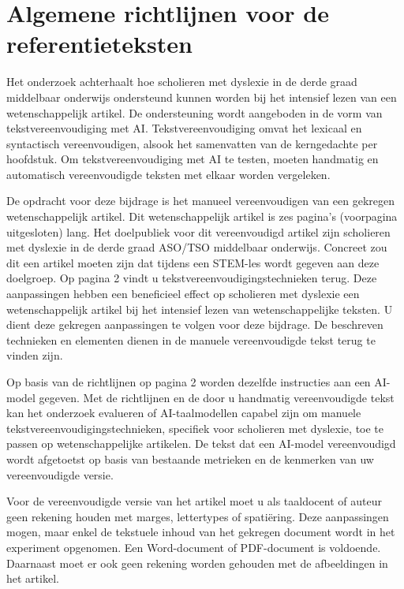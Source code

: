 \chapter{Algemene richtlijnen voor de referentieteksten}
\label{ch:referentietekst}
	
Het onderzoek achterhaalt hoe scholieren met dyslexie in de derde graad middelbaar onderwijs ondersteund kunnen worden bij het intensief lezen van een wetenschappelijk artikel. De ondersteuning wordt aangeboden in de vorm van tekstvereenvoudiging met AI. Tekstvereenvoudiging omvat het lexicaal en syntactisch vereenvoudigen, alsook het samenvatten van de kerngedachte per hoofdstuk. Om tekstvereenvoudiging met AI te testen, moeten handmatig en automatisch vereenvoudigde teksten met elkaar worden vergeleken. 
	
	\medspace
	
De opdracht voor deze bijdrage is het manueel vereenvoudigen van een gekregen wetenschappelijk artikel. Dit wetenschappelijk artikel is zes pagina's (voorpagina uitgesloten) lang. Het doelpubliek voor dit vereenvoudigd artikel zijn scholieren met dyslexie in de derde graad ASO/TSO middelbaar onderwijs. Concreet zou dit een artikel moeten zijn dat tijdens een STEM-les wordt gegeven aan deze doelgroep. Op pagina 2 vindt u tekstvereenvoudigingstechnieken terug. Deze aanpassingen hebben een beneficieel effect op scholieren met dyslexie een wetenschappelijk artikel bij het intensief lezen van wetenschappelijke teksten. U dient deze gekregen aanpassingen te volgen voor deze bijdrage. De beschreven technieken en elementen dienen in de manuele vereenvoudigde tekst terug te vinden zijn. 
	
	\medspace
	
Op basis van de richtlijnen op pagina 2 worden dezelfde instructies aan een AI-model gegeven. Met de richtlijnen en de door u handmatig vereenvoudigde tekst kan het onderzoek evalueren of AI-taalmodellen capabel zijn om manuele tekstvereenvoudigingstechnieken, specifiek voor scholieren met dyslexie, toe te passen op wetenschappelijke artikelen. De tekst dat een AI-model vereenvoudigd wordt afgetoetst op basis van bestaande metrieken en de kenmerken van uw vereenvoudigde versie. %
	
	\medspace
	
Voor de vereenvoudigde versie van het artikel moet u als taaldocent of auteur geen rekening houden met marges, lettertypes of spatiëring. Deze aanpassingen mogen, maar enkel de tekstuele inhoud van het gekregen document wordt in het experiment opgenomen. Een Word-document of PDF-document is voldoende. Daarnaast moet er ook geen rekening worden gehouden met de afbeeldingen in het artikel.  
	

